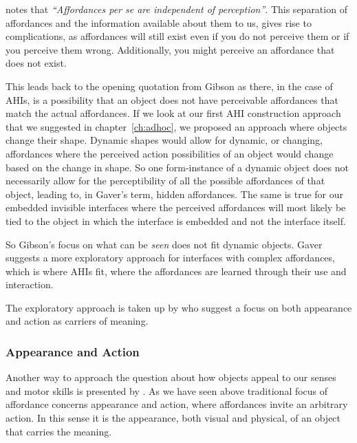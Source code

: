 \citet{gaver1991technology} notes that \emph{``Affordances per se are independent of perception''}.
This separation of affordances and the information available about them to us, gives rise to complications, as affordances will still exist even if you do not perceive them or if you perceive them wrong.
Additionally, you might perceive an affordance that does not exist.

This leads back to the opening quotation from Gibson as there, in the case of AHIs, is a possibility that an object does not have perceivable affordances that match the actual affordances.
If we look at our first AHI construction approach that we suggested in chapter~\ref{ch:adhoc}, we proposed an approach where objects change their shape.
Dynamic shapes would allow for dynamic, or changing, affordances where the perceived action possibilities of an object would change based on the change in shape.
So one form-instance of a dynamic object does not necessarily allow for the perceptibility of all the possible affordances of that object, leading to, in Gaver's term, hidden affordances. 
The same is true for our embedded invisible interfaces where the perceived affordances will most likely be tied to the object in which the interface is embedded and not the interface itself.

So Gibson's focus on what can be \emph{seen} does not fit dynamic objects.
Gaver suggests a more exploratory approach for interfaces with complex affordances, which is where AHIs fit, where the affordances are learned through their use and interaction.

The exploratory approach is taken up by \citet{djajadiningrat2004tangible} who suggest a focus on both appearance and action as carriers of meaning.

\subsubsection{Appearance and Action}
Another way to approach the question about how objects appeal to our senses and motor skills is presented by \citet{djajadiningrat2004tangible}.
As we have seen above traditional focus of affordance concerns appearance and action, where affordances invite an arbitrary action. 
In this sense it is the appearance, both visual and physical, of an object that carries the meaning.

